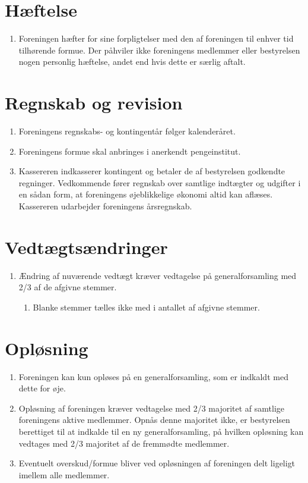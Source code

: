 \documentclass[a4paper, 10pt]{article}
\renewcommand\thesection{\textsection\arabic{section}}
\newenvironment{stykenum}{
  \begin{enumerate}[%
    label=Stk.~\arabic*:, ref=\thesection~Stk.~\arabic{enumi}, start=1]
}{\end{enumerate}}
\newenvironment{substykenum}{
  \begin{enumerate}[%
          label=Stk.~\arabic{enumi}.\arabic*:,
      ref=\thesection~Stk.~\arabic{enumi}.\arabic*, start=1]
}{\end{enumerate}}
\begin{document}
\section{Hæftelse}
\begin{stykenum}
    \item Foreningen hæfter for sine forpligtelser med den af foreningen til
        enhver tid tilhørende formue. Der påhviler ikke foreningens medlemmer
        eller bestyrelsen nogen personlig hæftelse, andet end hvis dette er
        særlig aftalt.
\end{stykenum}

\section{Regnskab og revision}
\begin{stykenum}
    \item Foreningens regnskabs- og kontingentår følger kalenderåret.

    \item Foreningens formue skal anbringes i anerkendt pengeinstitut.

    \item Kassereren indkasserer kontingent og betaler de af bestyrelsen
        godkendte regninger. Vedkommende fører regnskab over samtlige indtægter
        og udgifter i en sådan form, at foreningens øjeblikkelige økonomi altid
        kan aflæses. Kassereren udarbejder foreningens årsregnskab.
\end{stykenum}

\section{Vedtægtsændringer}
\begin{stykenum}
    \item Ændring af nuværende vedtægt kræver vedtagelse på generalforsamling
        med 2/3 af de afgivne stemmer.
    \begin{substykenum}
        \item Blanke stemmer tælles ikke med i antallet af afgivne stemmer.
    \end{substykenum}
\end{stykenum}

\section{Opløsning}
\begin{stykenum}
    \item Foreningen kan kun opløses på en generalforsamling, som er indkaldt
        med dette for øje.

    \item Opløsning af foreningen kræver vedtagelse med 2/3 majoritet af
        samtlige foreningens aktive medlemmer. Opnås denne majoritet ikke, er
        bestyrelsen berettiget til at indkalde til en ny generalforsamling, på
        hvilken opløsning kan vedtages med 2/3 majoritet af de fremmødte
        medlemmer.

    \item Eventuelt overskud/formue bliver ved opløsningen af foreningen delt
        ligeligt imellem alle medlemmer.
\end{stykenum}
\end{document}
